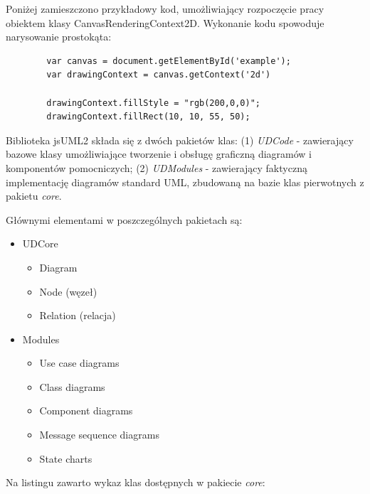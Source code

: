         Poniżej zamieszczono przykładowy kod, umożliwiający rozpoczęcie pracy obiektem klasy CanvasRenderingContext2D. Wykonanie kodu spowoduje narysowanie prostokąta:

        \begin{verbatim}
        var canvas = document.getElementById('example');
        var drawingContext = canvas.getContext('2d')

        drawingContext.fillStyle = "rgb(200,0,0)";  
        drawingContext.fillRect(10, 10, 55, 50);
        \end{verbatim}

        Biblioteka jsUML2 składa się z dwóch pakietów klas: (1) \emph{UDCode} - zawierający bazowe klasy umożliwiające tworzenie i obsługę graficzną diagramów i komponentów pomocniczych; (2) \emph{UDModules} - zawierający faktyczną implementację diagramów standard UML, zbudowaną na bazie klas pierwotnych z pakietu \emph{core}.

        Głównymi elementami w poszczególnych pakietach są:

        \begin{itemize}
          \item UDCore
            \begin{itemize}
              \item Diagram
              \item Node (węzeł)
              \item Relation (relacja)
            \end{itemize}
          \item Modules 
            \begin{itemize}
              \item Use case diagrams
              \item Class diagrams
              \item Component diagrams
              \item Message sequence diagrams
              \item State charts
            \end{itemize}
        \end{itemize}

        Na listingu zawarto wykaz klas dostępnych w pakiecie \emph{core}:

